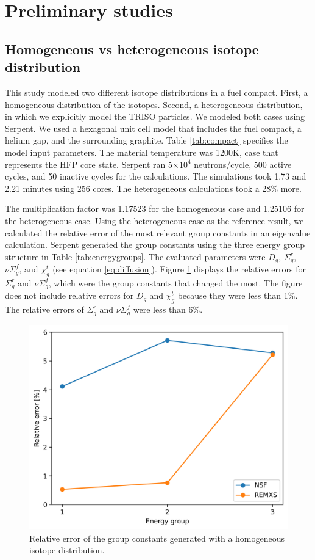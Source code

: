 \documentclass[11pt,letterpaper]{article}
\begin{document}
\section{Preliminary studies}

\subsection{Homogeneous vs heterogeneous isotope distribution}

This study modeled two different isotope distributions in a fuel compact.
First, a homogeneous distribution of the isotopes.
Second, a heterogeneous distribution, in which we explicitly model the TRISO particles.
We modeled both cases using Serpent.
We used a hexagonal unit cell model that includes the fuel compact, a helium gap, and the surrounding graphite.
Table \ref{tab:compact} specifies the model input parameters.
The material temperature was 1200K, case that represents the \gls{HFP} core state.
Serpent ran 5$\times 10^4$ neutrons/cycle, 500 active cycles, and 50 inactive cycles for the calculations.
The simulations took 1.73 and 2.21 minutes using 256 cores.
The heterogeneous calculations took a 28$\%$ more.

The multiplication factor was 1.17523 for the homogeneous case and 1.25106 for the heterogeneous case.
Using the heterogeneous case as the reference result, we calculated the relative error of the most relevant group constants in an eigenvalue calculation.
Serpent generated the group constants using the three energy group structure in Table \ref{tab:energygroups}.
The evaluated parameters were $D_g$, $\Sigma^r_g$, $\nu\Sigma^f_g$, and $\chi^t_g$ (see equation \ref{eq:diffusion}).
Figure \ref{fig:param-comparison} displays the relative errors for $\Sigma^r_g$ and $\nu\Sigma^f_g$, which were the group constants that changed the most.
The figure does not include relative errors for $D_g$ and $\chi^t_g$ because they were less than 1$\%$.
The relative errors of $\Sigma^r_g$ and $\nu\Sigma^f_g$ were less than 6$\%$.


\begin{figure}[htbp!]
	\centering
	\includegraphics[width=0.45\linewidth]{figures/param-comparison}
	\hfill
	\caption{Relative error of the group constants generated with a homogeneous isotope distribution.}
	\label{fig:param-comparison}
\end{figure}
\end{document}
